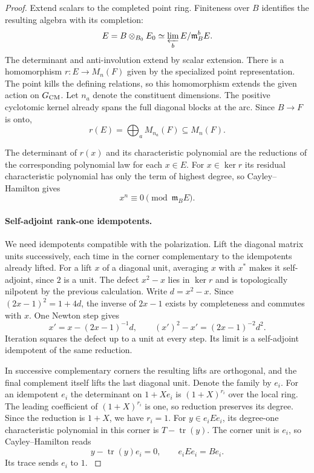 \begin{proof}
Extend scalars to the completed point ring. Finiteness over \(B\) identifies the resulting algebra with its completion: 
\[
 E=B\otimes_{B_0}E_0\simeq\varprojlim_b E/\mathfrak m_B^bE.
\]
 The determinant and anti-involution extend by scalar extension. There is a homomorphism
\(r:E\to M_n(F)\) given by the specialized point
representation. The point kills the defining relations,
so this homomorphism extends the given action on \(G_{\rm CM}\).
Let \(n_a\) denote the constituent dimensions. The positive cyclotomic kernel already spans the full diagonal blocks at the arc. Since \(B\to F\) is onto, 
\[
 r(E)=\bigoplus_a M_{n_a}(F)\subseteq M_n(F).
\]

The determinant of \(r(x)\) and its characteristic
polynomial are the reductions of the corresponding
polynomial law for each \(x\in E\). For \(x\in\ker r\) its residual characteristic polynomial has only the term of highest degree, so Cayley--Hamilton gives
\[
 x^n\equiv0\pmod{\mathfrak m_B E}.
\]

\paragraph{Self-adjoint rank-one idempotents.}
We need idempotents compatible with the polarization. Lift the diagonal matrix units
successively, each time in the
corner complementary to the idempotents already lifted.
For a lift \(x\) of a diagonal unit, averaging \(x\) with
\(x^*\) makes it self-adjoint, since \(2\) is a unit.
The defect \(x^2-x\) lies in \(\ker r\) and is topologically
nilpotent by the previous calculation. Write \(d=x^2-x\). Since \((2x-1)^2=1+4d\), the inverse of
\(2x-1\) exists by completeness and commutes with \(x\).
One Newton step gives
\[
      x'=x-(2x-1)^{-1}d,\qquad (x')^2-x'=(2x-1)^{-2}d^2 .
\]
Iteration squares the defect up to a unit at every step.
Its limit is a self-adjoint idempotent of the same reduction.

In successive complementary corners the resulting lifts
are orthogonal, and the final complement itself lifts the
last diagonal unit. Denote the family by \(e_i\).
For an idempotent \(e_i\) the determinant on \(1+Xe_i\) is
\((1+X)^{r_i}\) over the local ring. The leading coefficient of \((1+X)^{r_i}\) is one, so reduction
preserves its degree. Since the reduction is \(1+X\), we have \(r_i=1\).
For \(y\in e_iEe_i\), its degree-one characteristic polynomial
in this corner is \(T-\operatorname{tr}(y)\). The corner unit is
\(e_i\), so Cayley--Hamilton reads
\[
 y-\operatorname{tr}(y)e_i=0,\qquad e_iEe_i=B e_i .
\] Its trace sends \(e_i\) to \(1\).
 \cite{chenevier}\label{cor:ordinary-patching-matrices-5}


\end{proof}
